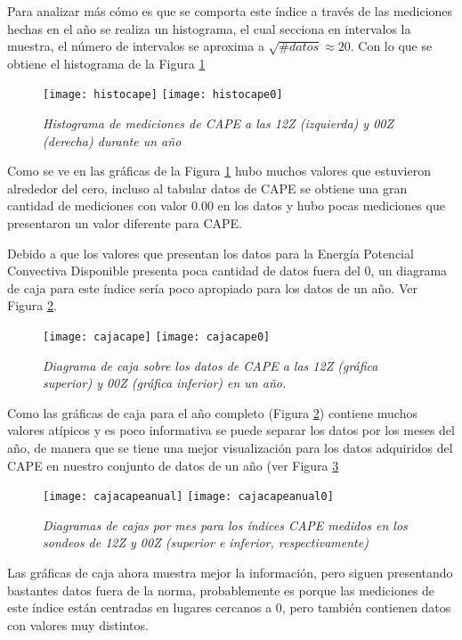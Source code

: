 Para analizar más cómo es que se comporta este índice a través de las mediciones hechas en el año se realiza un histograma, el cual secciona en intervalos la muestra, el número de intervalos se aproxima a $\sqrt{\# datos} \approx 20$.
Con lo que se obtiene el histograma de la Figura \ref{capeh12}
\begin{figure}[ht!]
\centering
\texttt{[image: histocape]} \texttt{[image: histocape0]}
\caption{\textit{Histograma de mediciones de CAPE a las 12Z (izquierda) y 00Z (derecha) durante un año}}
\label{capeh12}
\end{figure}
Como se ve en las gráficas de la Figura \ref{capeh12} hubo muchos valores que estuvieron alrededor del cero, incluso al tabular datos de CAPE se obtiene una gran cantidad de mediciones con valor 0.00  en los datos y hubo pocas mediciones que presentaron un valor diferente para CAPE.

\pagebreak
Debido a que los valores que presentan los datos para la Energía Potencial Convectiva Disponible presenta poca cantidad de datos fuera del 0, un diagrama de caja para este índice sería poco apropiado para los datos de un año. Ver Figura \ref{cajacape}.

\begin{figure}[ht!]
\centering
\texttt{[image: cajacape]}
\texttt{[image: cajacape0]}
\caption{\textit{Diagrama de caja sobre los datos de CAPE a las 12Z (gráfica superior) y 00Z (gráfica inferior)  en un año.}}
\label{cajacape}
\end{figure}

\pagebreak
Como las gráficas de caja para el año completo (Figura \ref{cajacape}) contiene muchos valores atípicos y es poco informativa se puede separar los datos por los meses del año, de manera que se tiene una mejor visualización para los datos adquiridos del CAPE en nuestro conjunto de datos de un año (ver Figura \ref{capemens}

\begin{figure}[ht!]
\centering
\texttt{[image: cajacapeanual]} \texttt{[image: cajacapeanual0]}
\caption{\textit{Diagramas de cajas por mes para los índices CAPE medidos en los sondeos de 12Z y 00Z (superior e inferior, respectivamente)}}
\label{capemens}
\end{figure}

Las gráficas de caja ahora muestra mejor la información, pero siguen presentando bastantes datos fuera de la norma, probablemente es porque las mediciones de este índice están centradas en lugares cercanos a 0, pero también contienen datos con valores muy distintos.

